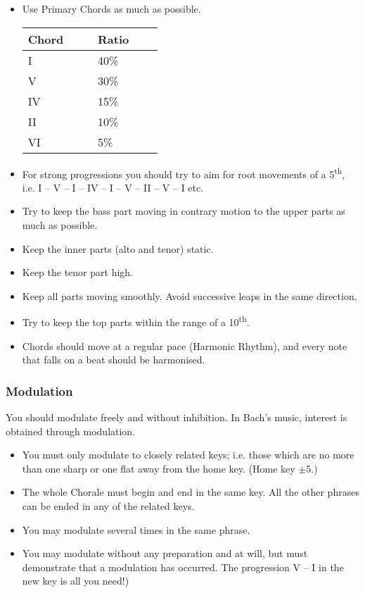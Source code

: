 \documentclass{article}
\begin{document}
\begin{itemize}
    \item Use Primary Chords as much as possible.

    \begin{tabular}{||p{0.2\linewidth}|p{0.2\linewidth}||}
        \hline
        Chord & Ratio\\
        \hline
        I & 40\%\\
        V & 30\%\\
        IV & 15\%\\
        II & 10\%\\
        VI & 5\%\\
        \hline
    \end{tabular}

\item For strong progressions you should try to aim for root movements of a 5\textsuperscript{th}, i.e. I -- V -- I --  IV -- I -- V -- II -- V -- I etc.\footnotemark
    \item Try to keep the bass part moving in contrary motion to the upper parts as much as possible.
    \item Keep the inner parts (alto and tenor) static.
    \item Keep the tenor part high.
    \item Keep all parts moving smoothly.
        Avoid successive leaps in the same direction.
    \item Try to keep the top parts within the range of a 10\textsuperscript{th}.
    \item Chords should move at a regular pace (Harmonic Rhythm), and every note that falls on a beat should be harmonised.
\end{itemize}

\subsubsection{Modulation}

You should modulate freely and without inhibition.
In Bach’s music, interest is obtained through modulation.

\begin{itemize}
    \item You must only modulate to closely related keys; i.e. those which are no more than one sharp or one flat away from the home key.
        (Home key $\pm$5.)
    \item The whole Chorale must begin and end in the same key.
        All the other phrases can be ended in any of the related keys.
    \item You may modulate several times in the same phrase.
    \item You may modulate without any preparation and at will, but must demonstrate that a modulation has occurred.
        The progression V -- I in the new key is all you need!)
\end{itemize}
\end{document}

